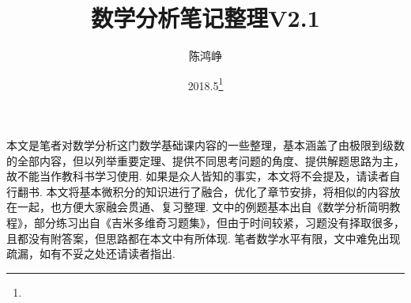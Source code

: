 \documentclass[11pt,UTF8]{ctexart}
\title{数学分析笔记整理V2.1}
\author{陈鸿峥}
\date{2018.5\footnote{\text{Build 20180507}}}%
\renewcommand{\thefootnote}{\fnsymbol{footnote}}
\begin{document}
\maketitle
\renewcommand{\thefootnote}{\arabic{footnote}}
\setcounter{footnote}{0}

\setcounter{tocdepth}{2}%
\tableofcontents
\bigskip\bigskip\bigskip

\par 本文是笔者对数学分析这门数学基础课内容的一些整理，基本涵盖了由极限到级数的全部内容，但以列举重要定理、提供不同思考问题的角度、提供解题思路为主，故不能当作教科书学习使用. 如果是众人皆知的事实，本文将不会提及，请读者自行翻书. 本文将基本微积分的知识进行了融合，优化了章节安排，将相似的内容放在一起，也方便大家融会贯通、复习整理. 文中的例题基本出自《数学分析简明教程》，部分练习出自《吉米多维奇习题集》，但由于时间较紧，习题没有择取很多，且都没有附答案，但思路都在本文中有所体现. 笔者数学水平有限，文中难免出现疏漏，如有不妥之处还请读者指出. 










\end{document}
